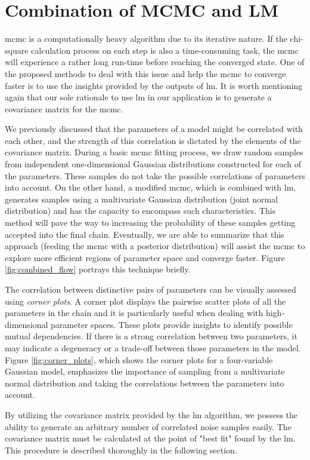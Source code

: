 \documentclass[12pt, TexShade, letterpaper]{report}
\begin{document}
\section{Combination of MCMC and LM}
\gls{mcmc} is a computationally heavy algorithm due to its iterative nature. If the chi-square calculation process on each step is also a time-consuming task, the \gls{mcmc} will experience a rather long run-time before reaching the converged state. One of the proposed methods to deal with this issue and help the \gls{mcmc} to converge faster is to use the insights provided by the outputs of \gls{lm}. It is worth mentioning again that our sole rationale to use \gls{lm} in our application is to generate a covariance matrix for the \gls{mcmc}.\par
We previously discussed that the parameters of a model might be correlated with each other, and the strength of this correlation is dictated by the elements of the covariance matrix. During a basic \gls{mcmc} fitting process, we draw random samples from independent one-dimensional Gaussian distributions constructed for each of the parameters. These samples do not take the possible correlations of parameters into account. On the other hand, a modified \gls{mcmc}, which is combined with \gls{lm}, generates samples using a multivariate Gaussian distribution (joint normal distribution) and has the capacity to encompass such characteristics. This method will pave the way to increasing the probability of these samples getting accepted into the final chain. Eventually, we are able to summarize that this approach (feeding the \gls{mcmc} with a posterior distribution) will assist the \gls{mcmc} to explore more efficient regions of parameter space and converge faster. Figure \ref{fig:combined_flow} portrays this technique briefly.\par
The correlation between distinctive pairs of parameters can be visually assessed using \emph{corner plots}. A corner plot displays the pairwise scatter plots of all the parameters in the chain and it is particularly useful when dealing with high-dimensional parameter spaces. These plots provide insights to identify possible mutual dependencies. If there is a strong correlation between two parameters, it may indicate a degeneracy or a trade-off between those parameters in the model. Figure \ref{fig:corner_plots}, which shows the corner plots for a four-variable Gaussian model, emphasizes the importance of sampling from a multivariate normal distribution and taking the correlations between the parameters into account.\par
By utilizing the covariance matrix provided by the \gls{lm} algorithm, we possess the ability to generate an arbitrary number of correlated noise samples easily. The covariance matrix must be calculated at the point of "best fit" found by the \gls{lm}. This procedure is described thoroughly in the following section.\par
\end{document}
